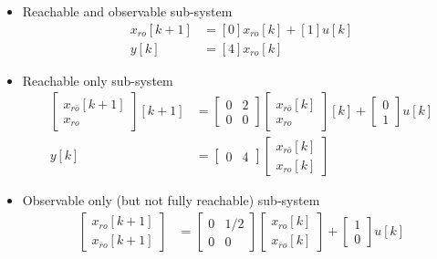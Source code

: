 \documentclass[twoside]{article}
\begin{document}
\begin{itemize}
    \item Reachable and observable sub-system
    \begin{align*}
        x_{ro}[k+1] &= [0] x_{ro}[k] + [1] u[k]
        \\
        y[k] &= [4] x_{ro}[k]
    \end{align*}
    \item Reachable only sub-system
    \begin{align*}
        \begin{bmatrix} x_{r\bar{o}}[k+1] \\ x_{ro}\end{bmatrix}[k+1] &= 
        \left[ \begin{array}{c|c} 0 & 2 \\ \hline 
    0 & 0  \end{array} \right]
    \begin{bmatrix} x_{r\bar{o}}[k] \\ x_{ro}\end{bmatrix}[k] + \left[ \begin{array}{c} 0 \\ 1 \end{array} \right] u[k]
        \\
        y[k] &= \left[ \begin{array}{c|c} 0 & 4 \end{array} \right] \begin{bmatrix} x_{r\bar{o}}[k] \\ x_{ro}[k] \end{bmatrix}  
    \end{align*}
    \item Observable only (but not fully reachable) sub-system
    \begin{align*}
        \begin{bmatrix} x_{ro}[k+1] \\ x_{\bar{r}o}[k+1] \end{bmatrix} &= 
        \left[ \begin{array}{c|c} 0 & 1/2 \\ \hline 
    0 & 0  \end{array} \right]
    \begin{bmatrix} x_{ro}[k] \\ x_{\bar{r}o}[k] \end{bmatrix} + \left[ \begin{array}{c} 1 \\ 0 \end{array} \right] u[k]

\end{align*}
\end{itemize}
\end{document}
